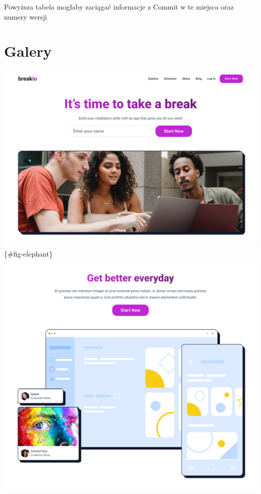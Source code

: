 \documentclass[
  a4paper,
  DIV=11,
  numbers=noendperiod,
  oneside,
  open=any]{scrreprt}
\begin{document}
Powyższa tabela mogłaby zaciągać informacje z Commit w te miejsca oraz
numery wersji


\chapter{Galery}\label{galery}

\includegraphics{images/wniosek1.png}\{\#fig-elephant\}
\includegraphics{images/wniosek2.png}
\end{document}

